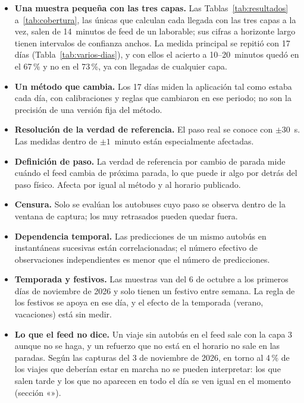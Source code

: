 \begin{itemize}
  \item \textbf{Una muestra pequeña con las tres capas.} Las Tablas~\ref{tab:resultados} a~\ref{tab:cobertura}, las
        únicas que calculan cada llegada con las tres capas a la vez, salen de 14~minutos de feed de un laborable; sus cifras a horizonte
        largo tienen intervalos de confianza anchos. La medida principal se repitió con 17 días
        (Tabla~\ref{tab:varios-dias}), y con ellos el acierto a 10--20~minutos quedó en el 67\,\% y no en el 73\,\%, ya
        con llegadas de cualquier capa.
  \item \textbf{Un método que cambia.} Los 17 días miden la aplicación tal como estaba cada día, con calibraciones y
        reglas que cambiaron en ese periodo; no son la precisión de una versión fija del método.
  \item \textbf{Resolución de la verdad de referencia.} El paso real se conoce con $\pm30$~s. Las medidas dentro de
        $\pm1$~minuto están especialmente afectadas.
  \item \textbf{Definición de paso.} La verdad de referencia por cambio de parada mide cuándo el feed cambia de
        próxima parada, lo que puede ir algo por detrás del paso físico. Afecta por igual al método y al horario publicado.
  \item \textbf{Censura.} Solo se evalúan los autobuses cuyo paso se observa dentro de la ventana de captura; los muy
        retrasados pueden quedar fuera.
  \item \textbf{Dependencia temporal.} Las predicciones de un mismo autobús en instantáneas sucesivas están
        correlacionadas; el número efectivo de observaciones independientes es menor que el número de predicciones.
  \item \textbf{Temporada y festivos.} Las muestras van del 6 de octubre a los primeros días de noviembre de 2026 y
        solo tienen un festivo entre semana. La regla de
        los festivos se apoya en ese día, y el efecto de la temporada (verano, vacaciones) está sin medir.
  \item \textbf{Lo que el feed no dice.} Un viaje sin autobús en el feed sale con la capa 3 aunque no se haga, y un
        refuerzo que no está en el horario no sale en las paradas. Según las capturas del 3 de noviembre de 2026, en
        torno al 4\,\% de los viajes que deberían estar en marcha no se pueden interpretar: los que salen tarde y los
        que no aparecen en todo el día se ven igual en el momento (sección «»).

\end{itemize}
